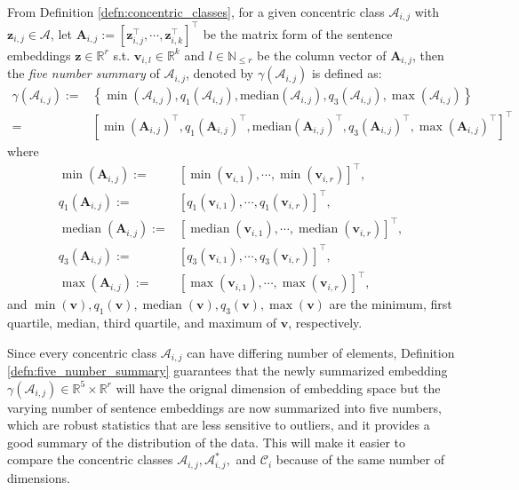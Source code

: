 \begin{defn}\label{defn:five_number_summary}
    From Definition \ref{defn:concentric_classes}, for a given concentric class $\mathscr{A}_{i,j}$ with $\mathbf{z}_{i,j}\in\mathscr{A}$, let $\mathbf{A}_{i,j}:=[\mathbf{z}_{i,j}^{\top},\cdots,\mathbf{z}_{i,k}^{\top}]^{\top}$ be the matrix form of the sentence embeddings $\mathbf{z}\in\mathbb{R}^r$ s.t. $\mathbf{v}_{i,l}\in\mathbb{R}^k$ and $l\in\mathbb{N}_{\leq r}$ be the column vector of $\mathbf{A}_{i,j}$, then the \textit{five number summary} of $\mathscr{A}_{i,j}$, denoted by $\gamma(\mathscr{A}_{i,j})$ is defined as:
    \begin{align}
        \gamma(\mathscr{A}_{i,j}):=&\left\{\min(\mathscr{A}_{i,j}),q_1(\mathscr{A}_{i,j}),\text{median}(\mathscr{A}_{i,j}),q_3(\mathscr{A}_{i,j}),\max(\mathscr{A}_{i,j})\right\}\\
        =&\left[\min(\mathbf{A}_{i,j})^{\top},q_1(\mathbf{A}_{i,j})^{\top},\text{median}(\mathbf{A}_{i,j})^{\top},q_3(\mathbf{A}_{i,j})^{\top},\max(\mathbf{A}_{i,j})^{\top}\right]^{\top}
    \end{align}
    where 
    \begin{align}
        \min(\mathbf{A}_{i,j}):=&[\min(\mathbf{v}_{i,1}),\cdots,\min(\mathbf{v}_{i,r})]^{\top},\\
        q_1(\mathbf{A}_{i,j}):=&[q_1(\mathbf{v}_{i,1}),\cdots,q_1(\mathbf{v}_{i,r})]^{\top},\\
        \operatorname{median}(\mathbf{A}_{i,j}):=&[\operatorname{median}(\mathbf{v}_{i,1}),\cdots,\operatorname{median}(\mathbf{v}_{i,r})]^{\top},\\
        q_3(\mathbf{A}_{i,j}):=&[q_3(\mathbf{v}_{i,1}),\cdots,q_3(\mathbf{v}_{i,r})]^{\top},\\
        \max(\mathbf{A}_{i,j}):=&[\max(\mathbf{v}_{i,1}),\cdots,\max(\mathbf{v}_{i,r})]^{\top},
    \end{align}
    and $\min(\mathbf{v}),q_1(\mathbf{v}),\operatorname{median}(\mathbf{v}),q_3(\mathbf{v}),\max(\mathbf{v})$ are the minimum, first quartile, median, third quartile, and maximum of $\mathbf{v}$, respectively.
\end{defn}
\begin{remark}
    Since every concentric class $\mathscr{A}_{i,j}$ can have differing number of elements, Definition \ref{defn:five_number_summary} guarantees that the newly summarized embedding $\gamma(\mathscr{A}_{i,j})\in\mathbb{R}^5\times\mathbb{R}^r$ will have the orignal dimension of embedding space but the varying number of sentence embeddings are now summarized into five numbers, which are robust statistics that are less sensitive to outliers, and it provides a good summary of the distribution of the data. This will make it easier to compare the concentric classes $\mathscr{A}_{i,j},\mathscr{A}_{i,j}^{*},$ and $\mathscr{C}_i$ because of the same number of dimensions.
\end{remark}
